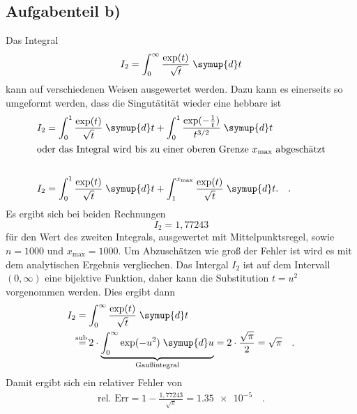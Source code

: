\subsection*{Aufgabenteil b)}
Das Integral
\begin{equation*}
  I_2=\int_{0}^\infty \frac{\exp(t)}{\sqrt{t}} \;\symup{d}t
\end{equation*}
kann auf verschiedenen Weisen ausgewertet werden.
Dazu kann es einerseits so umgeformt werden, dass die Singutätität wieder eine hebbare ist
\begin{align*}
  I_2 &= \int_{0}^1 \frac{\exp(t)}{\sqrt{t}} \;\symup{d}t + \int_{0}^1 \frac{\exp(-\frac{1}{t})}{t^{3/2}} \;\symup{d}t \\
  \intertext{oder das Integral wird bis zu einer oberen Grenze $x_\text{max}$ abgeschätzt}\\
  I_2 &= \int_{0}^1 \frac{\exp(t)}{\sqrt{t}} \;\symup{d}t + \int_{1}^{x_{\text{max}}} \frac{\exp(t)}{\sqrt{t}} \;\symup{d}t. \quad.
\end{align*}
Es ergibt sich bei beiden Rechnungen
\begin{equation*}
  I_2 = 1,77243
\end{equation*}
für den Wert des zweiten Integrals, ausgewertet mit Mittelpunktsregel, sowie $n=1000$ und $x_{\text{max}}=1000$. Um Abzuschätzen wie groß der Fehler ist wird es mit dem analytischen Ergebnis vergliechen.
Das Intergal $I_2$ ist auf dem Intervall $(0,\infty)$ eine bijektive Funktion, daher kann die Substitution $t=u^2$ vorgenommen werden.
Dies ergibt dann
\begin{align*}
  I_2 &=\int_{0}^\infty \frac{\exp(t)}{\sqrt{t}} \;\symup{d}t \\
  &\overset{\mathclap{\text{sub.}}}{=}2\cdot \underbrace{\int_{0}^\infty \exp(-u^2) \;\symup{d}u}_{\mathclap{\text{Gaußintegral}}} = 2\cdot\frac{\sqrt{\pi}}{2}=\sqrt{\pi} \quad.
\end{align*}
Damit ergibt sich ein relativer Fehler von
\begin{align*}
  \text{rel. Err} = 1-\frac{1,77243}{\sqrt{\pi}} = \num{1.35e-5}\quad.
\end{align*}

